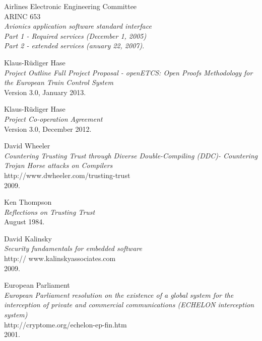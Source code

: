 \documentclass{template/openetcs_report}
\begin{document}
\begin{thebibliography}{99}
  Airlines Electronic Engineering Committee\\ARINC 653\\
  \emph{Avionics application software standard interface\\ 
Part 1 - Required services (December 1, 2005)\\
Part 2 - extended services (anuary 22, 2007)}.

  Klaus-R{\"u}diger Hase\\
  \emph{Project Outline Full Project Proposal - openETCS: Open Proofs Methodology for the European Train Control System}\\
  Version 3.0,
  January 2013.

  Klaus-R{\"u}diger Hase\\
  \emph{Project Co-operation Agreement}\\
  Version 3.0,
  December 2012.

  David Wheeler\\
  \emph{Countering Trusting Trust through Diverse Double-Compiling (DDC)- Countering Trojan Horse attacks on Compilers}\\
  http://www.dwheeler.com/trusting-trust\\
  2009.

  Ken Thompson\\
  \emph{Reflections on Trusting Trust}\\
  August 1984.

  David Kalinsky\\
  \emph{Security fundamentals for embedded software}\\
  http:// www.kalinskyassociates.com\\
  2009.

  European Parliament\\
  \emph{ European Parliament resolution on the existence of a global system for the interception of private and commercial communications (ECHELON interception system)}\\
  http://cryptome.org/echelon-ep-fin.htm\\
  2001.

  
\end{thebibliography}

\end{document}

